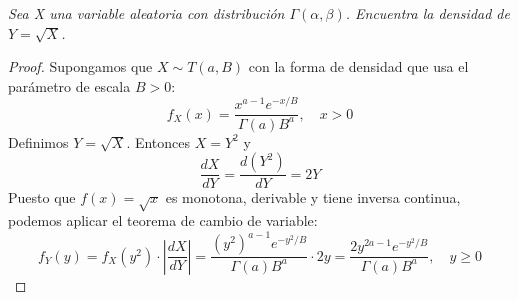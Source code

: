\documentclass[11pt,letterpaper]{article}
\begin{document}
\begin{tcolorbox}[
	title = \textcolor{black}{\textcolor{white}{Problema 3}},]
\textit{Sea X una variable aleatoria con distribuci\'on $\Gamma(\alpha,\beta)$. Encuentra
  la densidad de $Y=\sqrt{X}$.
}
\end{tcolorbox}
\begin{proof}
    Supongamos que \( X \sim T(a, B) \) con la forma de densidad que usa el parámetro de escala \( B > 0 \):
\[
f_X(x) = \frac{x^{a-1} e^{-x/B}}{\Gamma(a) B^a}, \quad x > 0
\]
Definimos \( Y = \sqrt{X} \). Entonces \( X = Y^2 \) y
\[
\frac{dX}{dY} = \frac{d(Y^2)}{dY} = 2Y
\]
Puesto que $f(x)=\sqrt{x}$ es monotona, derivable y tiene inversa continua, podemos aplicar el teorema de cambio de variable:
\[
f_Y(y) = f_X(y^2) \cdot \left| \frac{dX}{dY} \right| = \frac{(y^2)^{a-1} e^{-y^2/B}}{\Gamma(a) B^a} \cdot 2y = \frac{2 y^{2a-1} e^{-y^2/B}}{\Gamma(a) B^a}, \quad y \geq 0
\]
\end{proof}
\end{document}
